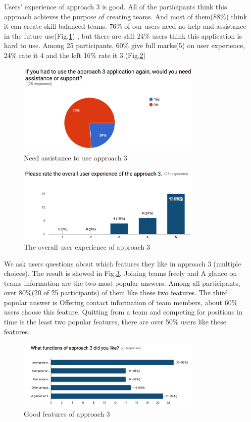 \documentclass[conference]{IEEEtran}
\begin{document}
Users' experience of approach 3 is good. All of the participants think this approach achieves the purpose of creating teams. And most of them(88\%) think it can create skill-balanced teams. 76\% of our users need no help and assistance in the future use(Fig.\ref{app3.ua}) , but there are still 24\% users think this application is hard to use. Among 25 participants, 60\% give full marks(5) on user experience, 24\% rate it 4 and the left 16\% rate it 3.(Fig.\ref{app3.ov}) 

\begin{figure}[H]
    \centering
    \includegraphics[width=9cm]{image/app3_useagain.png}
    \caption{Need assistance to use approach 3}
    \label{app3.ua}
\end{figure}

\begin{figure}[H]
    \centering
    \includegraphics[width=9cm]{image/app3_overall.png}
    \caption{The overall user experience of approach 3}
    \label{app3.ov}
\end{figure}

We ask users questions about  which features they like in approach 3 (multiple choices). The result is showed in Fig.\ref{app3.gf}, Joining teams freely and A glance on teams information are the two most popular answers. Among all participants, over 80\%(20 of 25 participants) of them like these two features. The third popular answer is Offering contact information of team members, about 60\% users choose this feature. Quitting from a team and competing for positions in time is the least two popular features, there are over 50\% users like these features.

\begin{figure}[H]
    \centering
    \includegraphics[width=9cm]{image/app3_goodfeatures.png}
    \caption{Good features of approach 3}
    \label{app3.gf}
\end{figure}
\end{document}
